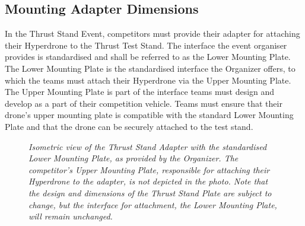\documentclass{article}
\begin{document}
\subsection{Mounting Adapter Dimensions}
In the Thrust Stand Event, competitors must provide their adapter for attaching their Hyperdrone to the Thrust Test Stand. The interface the event organiser provides is standardised and shall be referred to as the Lower Mounting Plate. The Lower Mounting Plate is the standardised interface the Organizer offers, to which the teams must attach their Hyperdrone via the Upper Mounting Plate. The Upper Mounting Plate is part of the interface teams must design and develop as a part of their competition vehicle. Teams must ensure that their drone's upper mounting plate is compatible with the standard Lower Mounting Plate and that the drone can be securely attached to the test stand. 
\begin{figure}[h!]
  \centering
 \caption{\textit{Isometric view of the Thrust Stand Adapter with the standardised Lower Mounting Plate, as provided by the Organizer. The competitor's Upper Mounting Plate, responsible for attaching their Hyperdrone to the adapter, is not depicted in the photo. Note that the design and dimensions of the Thrust Stand Plate are subject to change, but the interface for attachment, the Lower Mounting Plate, will remain unchanged.}}
 \end{figure}
\end{document}
